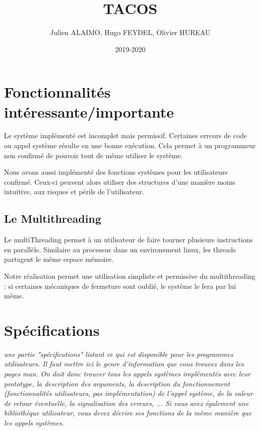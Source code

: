 \documentclass{article}
\title{TACOS}
\author{Julien ALAIMO, Hugo FEYDEL, Olivier HUREAU }
\date{2019-2020}
\begin{document}
\maketitle

\section{Fonctionnalités intéressante/importante}

Le système implémenté est incomplet mais permissif. Certaines erreurs de code ou appel système résulte en une bonne exécution. Cela permet à un programmeur non confirmé de pouvoir tout de même utiliser le système. 

Nous avons aussi implémenté des fonctions systèmes pour les utilisateurs confirmé. Ceux-ci peuvent alors utiliser des structures d'une manière moins intuitive, aux risques et périls de l'utilisateur.



\subsection{Le Multithreading}

Le multiThreading permet à un utilisateur de faire tourner plusieurs instructions en parallèle. Similaire au processus dans un environement linux, les threads partagent le même espace mémoire.

Notre réalisation permet une utilisation simpliste et permissive du multithreading : si certaines mécaniques de fermeture sont oublié, le système le fera par lui même. 

\newpage
\section{Spécifications}

\textit{
une partie "spécifications" listant ce qui est disponible pour les programmes utilisateurs. Il faut mettre ici le genre d'information que vous trouvez dans les pages man. On doit donc trouver tous les appels systèmes implémentés avec leur prototype, la description des arguments, la description du fonctionnement (fonctionnalités utilisateurs, pas implémentation) de l'appel système, de la valeur de retour éventuelle, la signalisation des erreurs, ... Si vous avez également une bibliothèque utilisateur, vous devez décrire ses fonctions de la même manière que les appels systèmes.
}
\end{document}
